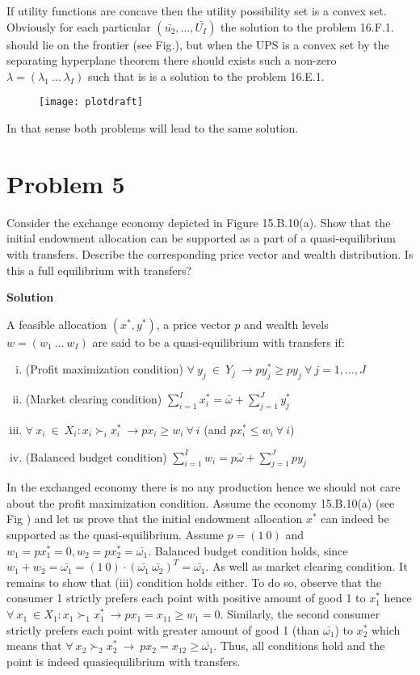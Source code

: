 \documentclass[a4paper]{article}
\begin{document}
If utility functions are concave then the utility possibility set is a convex set. Obviously for each particular $(\bar{u_2}, \dots, \bar{U_I})$ the solution to the problem 16.F.1. should lie on the frontier (see Fig.), but when the UPS is a convex set by the separating hyperplane theorem there should exists such a non-zero $\lambda = (\lambda_1\ \dots\ \lambda_I)$ such that is is a solution to the problem 16.E.1.
	\begin{figure}[h]
	\centering
	\texttt{[image: plotdraft]}
	\caption{}\label{fig2}
\end{figure}
In that sense both problems will lead to the same solution.
\section*{Problem 5}
Consider the exchange economy depicted in Figure 15.B.10(a). Show that the initial
endowment allocation can be supported as a part of a quasi-equilibrium with transfers.
Describe the corresponding price vector and wealth distribution. Is this a full equilibrium
with transfers?


\textbf{Solution}



A feasible allocation $(x^*, y^*)$, a price vector $p$ and wealth levels $w = (w_1\ \dots\ w_I)$ are said to be a quasi-equilibrium with transfers if:
\begin{enumerate}[(i)]
	\item (Profit maximization condition) $\forall\ y_j\ \in\ Y_j\ \to py_j^* \ge py_j\ \forall\ j = 1, \dots, J$
	\item (Market clearing condition) $\sum_{i=1}^I x^*_i = \bar{\omega} + \sum_{j=1}^Jy^*_j$
	\item $\forall\ x_i\ \in\ X_i: x_i \succ_i x_i^*\ \to px_i \ge w_i\ \forall\ i$ (and $px_i^* \le w_i\ \forall\ i$)
	\item (Balanced budget condition) $\sum_{i=1}^Iw_i = p\bar{\omega} + \sum_{j=1}^J py_j$
\end{enumerate}
In the exchanged economy there is no any production hence we should not care about the profit maximization condition. Assume the economy 15.B.10(a) (see Fig ) and let us prove that the initial endowment allocation $x^*$ can indeed be supported as the quasi-equilibrium. Assume $p = (1\ 0)$ and $w_1 = px_1^* = 0, w_2 = px^*_2 = \bar{\omega_1}$. Balanced budget condition holds, since $w_1 + w_2 = \bar{\omega_1} = (1\ 0) \cdot (\bar{\omega_1}\ \bar{\omega_2})^T = \bar{\omega_1}$. As well as market clearing condition. It remains to show that (iii) condition holds either. To do so, observe that the consumer 1 strictly prefers each point with positive amount of good 1 to $x_1^*$ hence $\forall\ x_1\ \in X_1: x_1 \succ_1 x_1^*\ \to px_1 = x_{11} \ge w_1 = 0$. Similarly, the second consumer strictly prefers each point with greater amount of good 1 (than $\bar{\omega_1}$) to $x_2^*$ which means that $\forall\ x_2 \succ_2 x_2^*\ \to\ px_2 = x_{12} \ge \bar{\omega_1}$. Thus, all conditions hold and the point is indeed quasiequilibrium with transfers.
\end{document}
